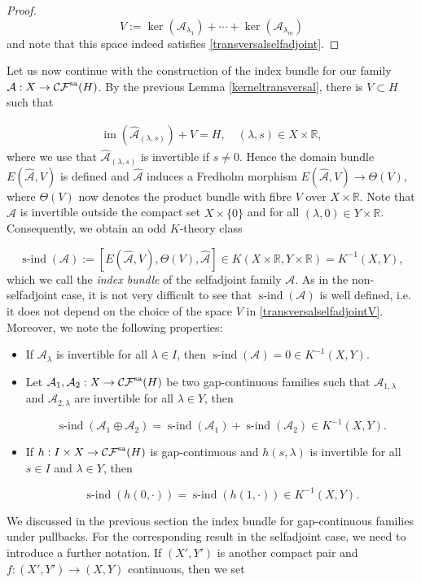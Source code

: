 \documentclass[a4paper,10pt]{article}
\DeclareMathOperator{\im}{im}
\DeclareMathOperator{\sind}{s-ind}
\begin{document}
\begin{proof}
\[V:=\ker(\mathcal{A}_{\lambda_1})+\cdots+\ker(\mathcal{A}_{\lambda_m})\]
and note that this space indeed satisfies \eqref{transversalselfadjoint}.
\end{proof}
\noindent 
Let us now continue with the construction of the index bundle for our family $\mathcal{A}:X\rightarrow\mathcal{CF}^\textup{sa}(H)$. By the previous Lemma \ref{kerneltransversal}, there is $V\subset H$ such that

\begin{align}\label{transversalselfadjointV}
\im(\hat{\mathcal{A}}_{(\lambda,s)})+V=H,\quad (\lambda,s)\in X\times\mathbb{R},
\end{align}
where we use that $\hat{\mathcal{A}}_{(\lambda,s)}$ is invertible if $s\neq 0$. Hence the domain bundle $E(\hat{\mathcal{A}},V)$ is defined and $\hat{\mathcal{A}}$ induces a Fredholm morphism $E(\hat{\mathcal{A}},V)\rightarrow\Theta(V)$, where $\Theta(V)$ now denotes the product bundle with fibre $V$ over $X\times\mathbb{R}$. Note that $\hat{\mathcal{A}}$ is invertible outside the compact set $X\times\{0\}$ and for all $(\lambda,0)\in Y\times\mathbb{R}$. Consequently, we obtain an odd $K$-theory class

\[\sind(\mathcal{A}):=[E(\hat{\mathcal{A}},V),\Theta(V),\hat{\mathcal{A}}]\in K(X\times\mathbb{R},Y\times\mathbb{R})=K^{-1}(X,Y),\]
which we call the \textit{index bundle} of the selfadjoint family $\mathcal{A}$. As in the non-selfadjoint case, it is not very difficult to see that $\sind(\mathcal{A})$ is well defined, i.e. it does not depend on the choice of the space $V$ in \eqref{transversalselfadjointV}. Moreover, we note the following properties:

\begin{itemize}
\item If $\mathcal{A}_\lambda$ is invertible for all $\lambda\in I$, then $\sind(\mathcal{A})=0\in K^{-1}(X,Y)$.
\item Let $\mathcal{A}_1,\mathcal{A}_2:X\rightarrow\mathcal{CF}^\textup{sa}(H)$ be two gap-continuous families such that $\mathcal{A}_{1,\lambda}$ and $\mathcal{A}_{2,\lambda}$ are invertible for all $\lambda\in Y$, then

\[\sind(\mathcal{A}_1\oplus\mathcal{A}_2)=\sind(\mathcal{A}_1)+\sind(\mathcal{A}_2)\in K^{-1}(X,Y).\]
\item If $h:I\times X\rightarrow\mathcal{CF}^\textup{sa}(H)$ is gap-continuous and $h(s,\lambda)$ is invertible for all $s\in I$ and $\lambda\in Y$, then

\[\sind(h(0,\cdot))=\sind(h(1,\cdot))\in K^{-1}(X,Y).\]  
\end{itemize}
\noindent
We discussed in the previous section the index bundle for gap-continuous families under pullbacks. For the corresponding result in the selfadjoint case, we need to introduce a further notation. If $(X',Y')$ is another compact pair and $f:(X',Y')\rightarrow(X,Y)$ continuous, then we set
\end{document}
